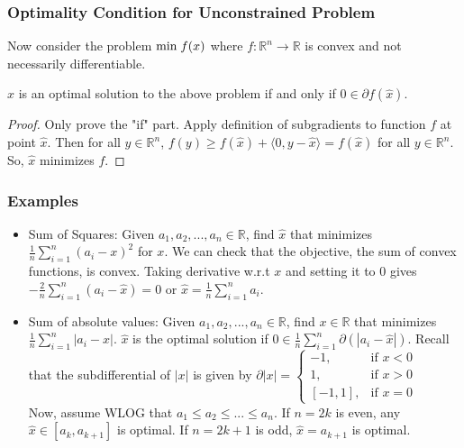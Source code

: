 \begin{frame}\frametitle{Optimality Condition for Unconstrained Problem}
    \hspace{2mm}Now consider the problem \textbf{$\text{min} \hspace{1mm} f(x)$} where $f: \mathbb{R}^n \rightarrow \mathbb{R}$ is convex and not necessarily differentiable.\\
    \vspace*{3mm}
    \begin{theorem}
        $\hat{x}$ is an optimal solution to the above problem if and only if $0 \in \partial f(\hat{x})$.
    \end{theorem}
    \begin{proof}
        Only prove the "if" part. Apply definition of subgradients to function $f$ at point $\hat{x}$. Then for all $y \in \mathbb{R}^n$, $f(y) \geq f(\hat{x}) + \langle 0, y-\hat{x} \rangle = f(\hat{x})$ for all $y \in \mathbb{R}^n$. So, $\hat{x}$ minimizes $f$.
    \end{proof}
\end{frame}

\begin{frame}\frametitle{Examples}
    \begin{itemize}
        \item Sum of Squares: Given $a_1, a_2, ... , a_n \in \mathbb{R}$, find $\hat{x}$ that minimizes $\frac{1}{n} \sum_{i=1}^{n} (a_i - x)^2$ for $x$. We can check that the objective, the sum of convex functions, is convex. Taking derivative w.r.t $x$ and setting it to 0 gives $-\frac{2}{n} \sum_{i=1}^{n} (a_i - \hat{x}) = 0$ or $\hat{x}=\frac{1}{n} \sum_{i=1}^{n} a_i$.
        \item Sum of absolute values: Given $a_1, a_2, ... , a_n \in \mathbb{R}$, find $x \in \mathbb{R}$ that minimizes $\frac{1}{n} \sum_{i=1}^{n} |a_i - x|$. $\hat{x}$ is the optimal solution if $0 \in \frac{1}{n} \sum_{i=1}^{n} \partial(|a_i - \hat{x}|)$. Recall that the subdifferential of $|x|$ is given by $\partial |x| = \begin{cases} -1, & \text{if $x<0$}\\
            1, & \text{if $x>0$}\\
            [-1,1], & \text{if $x=0$}
		 \end{cases}$\\
	Now, assume WLOG that $a_1 \leq a_2 \leq ... \leq a_n$. If $n=2k$ is even, any $\hat{x} \in [a_k, a_{k+1}]$ is optimal. If $n=2k+1$ is odd, $\hat{x}=a_{k+1}$ is optimal.
    \end{itemize}
\end{frame}

